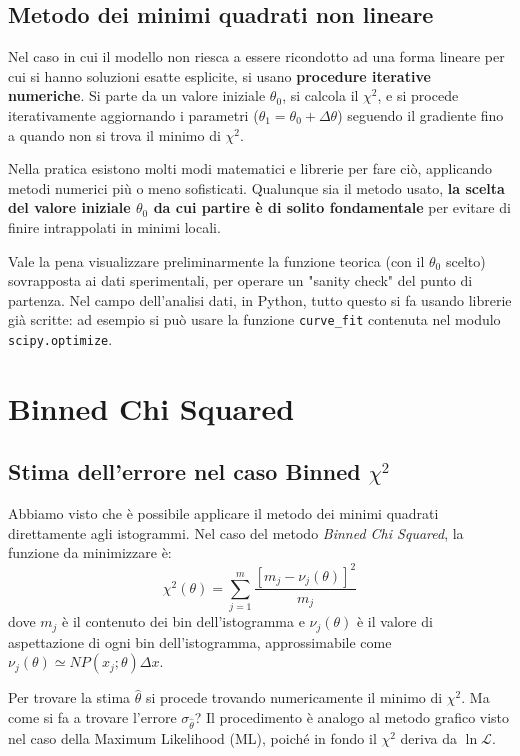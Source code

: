\documentclass[openany,a4paper,12pt]{book}
\theoremstyle{remark}
\begin{document}
\subsection*{Metodo dei minimi quadrati non lineare}
Nel caso in cui il modello non riesca a essere ricondotto ad una forma lineare per cui si hanno soluzioni esatte esplicite, si usano \textbf{procedure iterative numeriche}.
Si parte da un valore iniziale $\theta_0$, si calcola il $\chi^2$, e si procede iterativamente aggiornando i parametri ($\theta_1 = \theta_0 + \Delta \theta$) seguendo il gradiente fino a quando non si trova il minimo di $\chi^2$.

Nella pratica esistono molti modi matematici e librerie per fare ciò, applicando metodi numerici più o meno sofisticati. Qualunque sia il metodo usato, \textbf{la scelta del valore iniziale $\theta_0$ da cui partire è di solito fondamentale} per evitare di finire intrappolati in minimi locali.

Vale la pena visualizzare preliminarmente la funzione teorica (con il $\theta_0$ scelto) sovrapposta ai dati sperimentali, per operare un "sanity check" del punto di partenza. 
Nel campo dell'analisi dati, in Python, tutto questo si fa usando librerie già scritte: ad esempio si può usare la funzione \texttt{curve\_fit} contenuta nel modulo \texttt{scipy.optimize}. 

\section{Binned Chi Squared}
\subsection*{Stima dell'errore nel caso Binned $\chi^2$}

Abbiamo visto che è possibile applicare il metodo dei minimi quadrati direttamente agli istogrammi. Nel caso del metodo \textit{Binned Chi Squared}, la funzione da minimizzare è:
\begin{equation}
    \chi^2(\theta) = \sum_{j=1}^m \frac{[m_j - \nu_j(\theta)]^2}{m_j}
\end{equation}
dove $m_j$ è il contenuto dei bin dell'istogramma e $\nu_j(\theta)$ è il valore di aspettazione di ogni bin dell'istogramma, approssimabile come $\nu_j(\theta) \simeq N P(x_j; \theta) \Delta x$.

Per trovare la stima $\hat{\theta}$ si procede trovando numericamente il minimo di $\chi^2$. Ma come si fa a trovare l'errore $\sigma_{\hat{\theta}}$? Il procedimento è analogo al metodo grafico visto nel caso della Maximum Likelihood (ML), poiché in fondo il $\chi^2$ deriva da $\ln \mathcal{L}$.
\end{document}
